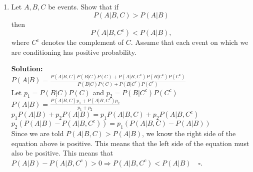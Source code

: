 \documentclass{article}
\newcommand{\solution}{\textbf{Solution: }}
\begin{document}
\begin{enumerate}[label=(\alph*)]
    \item Let $A, B, C$ be events. Show that if $$P(A|B, C) > P(A|B)$$ then $$P(A|B, C^c) < P(A|B),$$ where $C^c$ denotes the complement of $C$. Assume that each event on which we are conditioning has positive probability. 
    \begin{mdframed} \solution\\
    $P(A|B)=\frac{P(A|B,C)P(B|C)P(C)+P(A|B,C^c)P(B|C^c)P(C^c)}{P(B|C)P(C)+P(B|C^c)P(C^c)}$\\
    Let $p_1=P(B|C)P(C)$ and $p_2=P(B|C^c)P(C^c)$\\
    $P(A|B)=\frac{P(A|B,C)p_1+P(A|B,C^c)p_2}{p_1+p_2}$\\
    $p_1P(A|B)+p_2P(A|B)=p_1P(A|B,C)+p_2P(A|B,C^c)$\\
    $p_2(P(A|B)-P(A|B,C^c))=p_1(P(A|B,C)-P(A|B))$\\
    Since we are told $P(A|B,C)>P(A|B)$, we know the right side of the equation above is positive. This means that the left side of the equation must also be positive. This means that\\$P(A|B)-P(A|B,C^c) > 0 \Rightarrow P(A|B,C^c)<P(A|B) \quad \square$.
    \end{mdframed}
    
\end{enumerate}

\newpage
\end{document}
